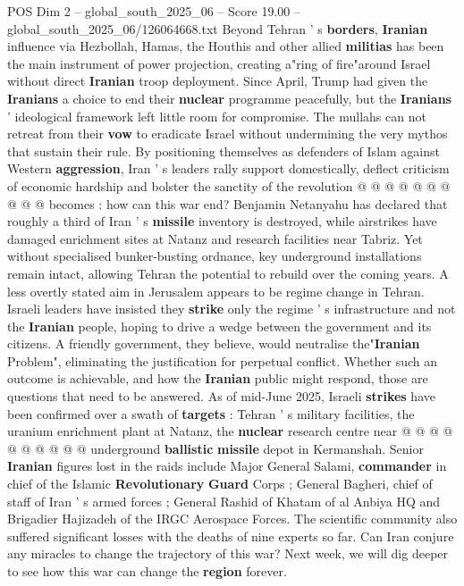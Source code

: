 \begin{textsample}{POS Dim 2 – global\_south\_2025\_06 – Score 19.00 – global\_south\_2025\_06/126064668.txt}
Beyond Tehran ' s \textbf{borders}, \textbf{Iranian} influence via Hezbollah, Hamas, the Houthis and other allied \textbf{militias} has been the main instrument of power projection, creating a"ring of fire"around Israel without direct \textbf{Iranian} troop deployment.
Since April, Trump had given the \textbf{Iranians} a choice to end their \textbf{nuclear} programme peacefully, but the \textbf{Iranians} ' ideological framework left little room for compromise.
The mullahs can not retreat from their \textbf{vow} to eradicate Israel without undermining the very mythos that sustain their rule.
By positioning themselves as defenders of Islam against Western \textbf{aggression}, Iran ' s leaders rally support domestically, deflect criticism of economic hardship and bolster the sanctity of the revolution @ @ @ @ @ @ @ @ @ @ becomes : how can this war end?
Benjamin Netanyahu has declared that roughly a third of Iran ' s \textbf{missile} inventory is destroyed, while airstrikes have damaged enrichment sites at Natanz and research facilities near Tabriz.
Yet without specialised bunker-busting ordnance, key underground installations remain intact, allowing Tehran the potential to rebuild over the coming years.
A less overtly stated aim in Jerusalem appears to be regime change in Tehran.
Israeli leaders have insisted they \textbf{strike} only the regime ' s infrastructure and not the \textbf{Iranian} people, hoping to drive a wedge between the government and its citizens.
A friendly government, they believe, would neutralise the"\textbf{Iranian} Problem", eliminating the justification for perpetual conflict.
Whether such an outcome is achievable, and how the \textbf{Iranian} public might respond, those are questions that need to be answered.
As of mid-June 2025, Israeli \textbf{strikes} have been confirmed over a swath of \textbf{targets} : Tehran ' s military facilities, the uranium enrichment plant at Natanz, the \textbf{nuclear} research centre near @ @ @ @ @ @ @ @ @ @ underground \textbf{ballistic} \textbf{missile} depot in Kermanshah.
Senior \textbf{Iranian} figures lost in the raids include Major General Salami, \textbf{commander} in chief of the Islamic \textbf{Revolutionary} \textbf{Guard} Corps ; General Bagheri, chief of staff of Iran ' s armed forces ; General Rashid of Khatam of al Anbiya HQ and Brigadier Hajizadeh of the IRGC Aerospace Forces.
The scientific community also suffered significant losses with the deaths of nine experts so far.
Can Iran conjure any miracles to change the trajectory of this war?
Next week, we will dig deeper to see how this war can change the \textbf{region} forever.

\end{textsample}
